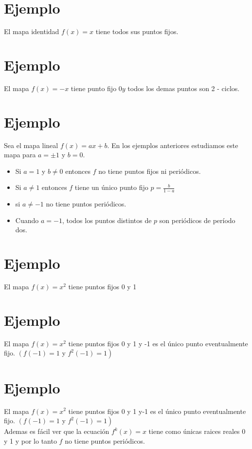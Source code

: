 \documentclass[11pt]{beamer}
\begin{document}
\section*{Ejemplo}
El mapa identidad $f(x)=x$ tiene todos sus puntos fijos.

\section*{Ejemplo}
El mapa $f(x)=-x$ tiene punto fijo $0 y$ todos los demas puntos son 2 - ciclos.

\section*{Ejemplo}
Sea el mapa lineal $f(x)=a x+b$. En los ejemplos anteriores estudiamos este mapa para $a= \pm 1$ y $b=0$.

\begin{itemize}
  \item Si $a=1$ y $b \neq 0$ entonces $f$ no tiene puntos fijos ni periódicos.
  \item Si $a \neq 1$ entonces $f$ tiene un único punto fijo $p=\frac{b}{1-a}$
  \item si $a \neq-1$ no tiene puntos periódicos.
  \item Cuando $a=-1$, todos los puntos distintos de $p$ son periódicos de período dos.
\end{itemize}

\section*{Ejemplo}
El mapa $f(x)=x^{2}$ tiene puntos fijos 0 y 1

\section*{Ejemplo}
El mapa $f(x)=x^{2}$ tiene puntos fijos 0 y 1 y -1 es el único punto eventualmente fijo. $\left(f(-1)=1\right.$ y $\left.f^{2}(-1)=1\right)$

\section*{Ejemplo}
El mapa $f(x)=x^{2}$ tiene puntos fijos 0 y 1 y-1 es el único punto eventualmente fijo. $\left(f(-1)=1\right.$ y $\left.f^{2}(-1)=1\right)$\\
Ademas es fácil ver que la ecuación $f^{k}(x)=x$ tiene como únicas raices reales 0 y 1 y por lo tanto $f$ no tiene puntos periódicos.
\end{document}
